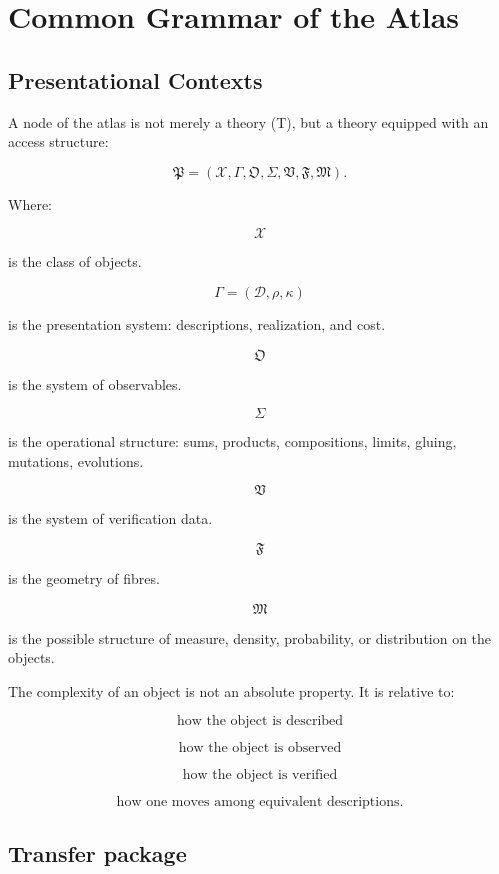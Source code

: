 \documentclass[11pt]{article}
\begin{document}
\section{Common Grammar of the Atlas}

\subsection{Presentational Contexts}

A node of the atlas is not merely a theory (T), but a theory equipped with an access structure:

\[
\mathfrak P=
(\mathcal X,\Gamma,\mathfrak O,\Sigma,\mathfrak V,\mathfrak F,\mathfrak M).
\]

Where:

\[
\mathcal X
\]

is the class of objects.

\[
\Gamma=(\mathcal D,\rho,\kappa)
\]

is the presentation system: descriptions, realization, and cost.

\[
\mathfrak O
\]

is the system of observables.

\[
\Sigma
\]

is the operational structure: sums, products, compositions, limits, gluing, mutations, evolutions.

\[
\mathfrak V
\]

is the system of verification data.

\[
\mathfrak F
\]

is the geometry of fibres.

\[
\mathfrak M
\]

is the possible structure of measure, density, probability, or distribution on the objects.

The complexity of an object is not an absolute property. It is relative to:

\[
\text{how the object is described}
\]

\[
\text{how the object is observed}
\]

\[
\text{how the object is verified}
\]

\[
\text{how one moves among equivalent descriptions.}
\]



\subsection{Transfer package}
\end{document}

